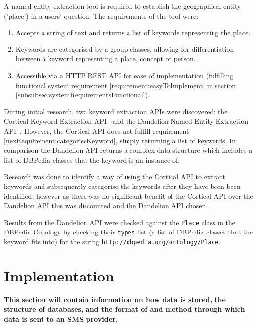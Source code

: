 \documentclass[authoryearcitations]{UoYCSproject}
\begin{document}
A named entity extraction tool is required to establish the geographical entity ('place') in a users' question. The requirements of the tool were:
\begin{enumerate}
  \item Accepts a string of text and returns a list of keywords representing the place.
  \item \label{nexRequirement:categoriseKeyword} Keywords are categorised by a group classes, allowing for differentiation between a keyword representing a place, concept or person.
  \item Accessible via a HTTP REST API for ease of implementation (fulfilling functional system requirement \ref{requirement:easyToImplement} in section \ref{subsubsec:systemRequirementsFunctional}).
\end{enumerate}

During initial research, two keyword extraction APIs were discovered: the Cortical Keyword Extraction API~\cite{serviceCorticalNex} and the Dandelion Named Entity Extraction API~\cite{serviceDandelionNex}. However, the Cortical API does not fulfill requirement \ref{nexRequirement:categoriseKeyword}, simply returning a list of keywords. In comparison the Dandelion API returns a complex data structure which includes a list of DBPedia classes that the keyword is an instance of.

Research was done to identify a way of using the Cortical API to extract keywords and subsequently categorise the keywords after they have been been identified; however as there was no significant benefit of the Cortical API over the Dandelion API this was discounted and the Dandelion API chosen.

Results from the Dandelion API were checked against the \texttt{Place} class in the DBPedia Ontology by checking their \texttt{types} list (a list of DBPedia classes that the keyword fits into) for the string \texttt{http://dbpedia.org/ontology/Place}.

\newpage
\chapter{Implementation}
\label{sec:implementation}
{\bf This section will contain information on how data is stored, the structure of databases, and the format of and method through which data is sent to an SMS provider.}
\end{document}
